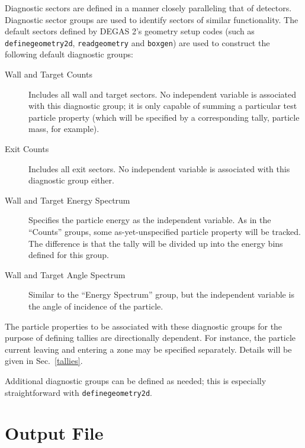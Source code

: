 \documentclass[12pt]{report}
\begin{document}
Diagnostic sectors are defined in a manner closely paralleling that of 
detectors. Diagnostic sector groups are used to identify sectors of
similar functionality. The default sectors defined by DEGAS 2's
geometry setup codes (such as
{\tt definegeometry2d}, {\tt readgeometry} and {\tt boxgen})
are used to construct the following
default diagnostic groups:
\begin{description}
  \item[Wall and Target Counts] Includes all wall and target sectors. No
independent variable is associated with this diagnostic group; it is only
capable of summing a particular test particle property (which will be
specified by a corresponding tally, particle mass, for example).
  \item[Exit Counts] Includes all exit sectors. No
independent variable is associated with this diagnostic group either.
  \item[Wall and Target Energy Spectrum] Specifies the particle
energy as the independent variable. As in the ``Counts'' groups, some
as-yet-unspecified particle property will be tracked. The difference is
that the tally will be divided up into the energy bins defined for this
group.
  \item[Wall and Target Angle Spectrum] Similar to the ``Energy Spectrum''
group, but the independent variable is the angle of incidence of the particle.
\end{description}

The particle properties to be associated with these diagnostic
groups for the purpose of defining tallies are directionally
dependent. For instance, the particle current leaving and entering
a zone may be specified separately. Details will be given in 
Sec.~\ref{tallies}.

Additional diagnostic groups can be defined as needed; this is 
especially straightforward with {\tt definegeometry2d}. 

\section{Output File}
\label{outputformat}
\end{document}
